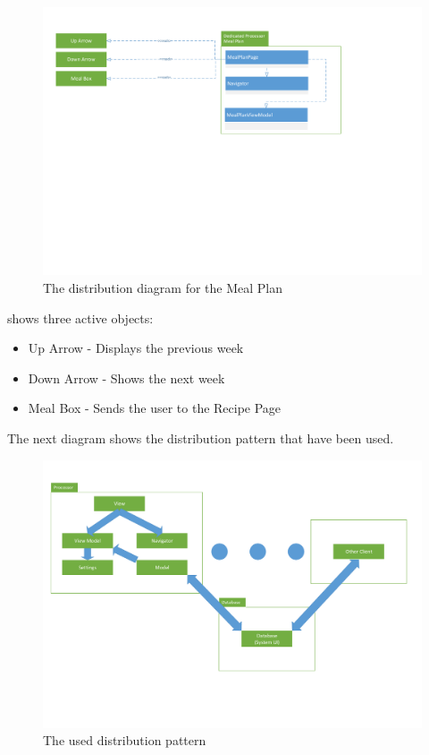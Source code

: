 \begin{figure}[H]
\includegraphics[width=\linewidth, clip=true, trim=0.5cm 10cm 6cm 1.5cm]{Grafik/FoodPlanner/DistributionMealPlan}
\centering
\caption{The distribution diagram for the Meal Plan}
\label{MPD}
\end{figure}

 shows three active objects:
\begin{itemize}
\item Up Arrow 
- Displays the previous week
\item Down Arrow 
- Shows the next week
\item Meal Box 
- Sends the user to the Recipe Page
\end{itemize}

The next diagram shows the distribution pattern that have been used.

\begin{figure}[H]
\includegraphics[width=\linewidth, clip=true, trim=0cm 4cm 0.5cm 1cm]{Grafik/FoodPlanner/FordelingsDiagram}
\centering
\caption{The used distribution pattern}
\label{DP}
\end{figure}

